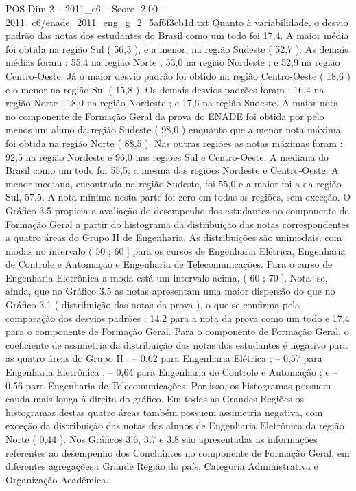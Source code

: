 \begin{textsample}{POS Dim 2 – 2011\_c6 – Score -2.00 – 2011\_c6/enade\_2011\_eng\_g\_2\_5af6f3cb1d.txt}
Quanto à variabilidade, o desvio padrão das notas dos estudantes do Brasil como um todo foi 17,4.
A maior média foi obtida na região Sul ( 56,3 ), e a menor, na região Sudeste ( 52,7 ).
As demais médias foram : 55,4 na região Norte ; 53,0 na região Nordeste ; e 52,9 na região Centro-Oeste.
Já o maior desvio padrão foi obtido na região Centro-Oeste ( 18,6 ) e o menor na região Sul ( 15,8 ).
Os demais desvios padrões foram : 16,4 na região Norte ; 18,0 na região Nordeste ; e 17,6 na região Sudeste.
A maior nota no componente de Formação Geral da prova do ENADE foi obtida por pelo menos um aluno da região Sudeste ( 98,0 ) enquanto que a menor nota máxima foi obtida na região Norte ( 88,5 ).
Nas outras regiões as notas máximas foram : 92,5 na região Nordeste e 96,0 nas regiões Sul e Centro-Oeste.
A mediana do Brasil como um todo foi 55,5, a mesma das regiões Nordeste e Centro-Oeste.
A menor mediana, encontrada na região Sudeste, foi 55,0 e a maior foi a da região Sul, 57,5.
A nota mínima nesta parte foi zero em todas as regiões, sem exceção.
O Gráfico 3.5 propicia a avaliação do desempenho dos estudantes no componente de Formação Geral a partir do histograma da distribuição das notas correspondentes a quatro áreas do Grupo II de Engenharia.
As distribuições são unimodais, com modas no intervalo ( 50 ; 60 ] para os cursos de Engenharia Elétrica, Engenharia de Controle e Automação e Engenharia de Telecomunicações.
Para o curso de Engenharia Eletrônica a moda está um intervalo acima, ( 60 ; 70 ].
Nota -se, ainda, que no Gráfico 3.5 as notas apresentam uma maior dispersão do que no Gráfico 3.1 ( distribuição das notas da prova ), o que se confirma pela comparação dos desvios padrões : 14,2 para a nota da prova como um todo e 17,4 para o componente de Formação Geral.
Para o componente de Formação Geral, o coeficiente de assimetria da distribuição das notas dos estudantes é negativo para as quatro áreas do Grupo II : – 0,62 para Engenharia Elétrica ; – 0,57 para Engenharia Eletrônica ; – 0,64 para Engenharia de Controle e Automação ; e – 0,56 para Engenharia de Telecomunicações.
Por isso, os histogramas possuem cauda mais longa à direita do gráfico.
Em todas as Grandes Regiões os histogramas destas quatro áreas também possuem assimetria negativa, com exceção da distribuição das notas dos alunos de Engenharia Eletrônica da região Norte ( 0,44 ).
Nos Gráficos 3.6, 3.7 e 3.8 são apresentadas as informações referentes ao desempenho dos Concluintes no componente de Formação Geral, em diferentes agregações : Grande Região do país, Categoria Administrativa e Organização Acadêmica.

\end{textsample}
